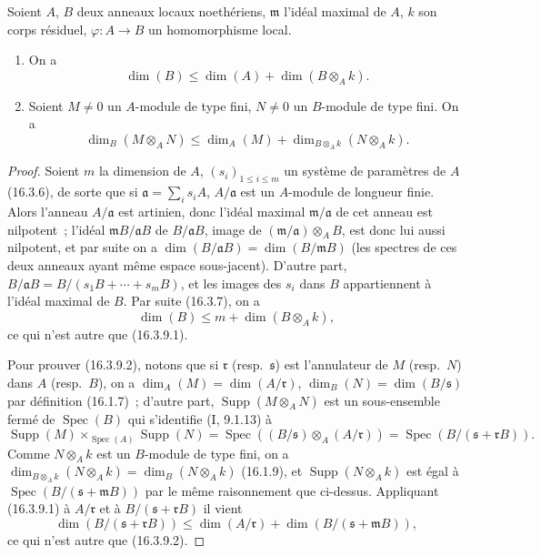 \begin{proposition}[16.3.9]
\label{0.16.3.9-fr}
Soient $A$, $B$ deux anneaux locaux noethériens, $\mathfrak{m}$ l'idéal maximal
de $A$, $k$ son corps résiduel, $\varphi:A\to B$ un homomorphisme local.
\begin{enumerate}
  \item[\rm{(i)}] On a
  \begin{equation}
  \label{0.16.3.9.1-fr}
  \tag{16.3.9.1}
    \dim(B)\leq\dim(A)+\dim(B\otimes_A k).
  \end{equation}
  \item[\rm{(ii)}] Soient $M\neq0$ un $A$-module de type fini, $N\neq0$ un
  $B$-module de type fini. On a
  \begin{equation}
  \label{0.16.3.9.2-fr}
  \tag{16.3.9.2}
    \dim_B(M\otimes_A N)
    \leq\dim_A(M)+\dim_{B\otimes_A k}(N\otimes_A k).
  \end{equation}
\end{enumerate}
\end{proposition}

\begin{proof}
Soient $m$ la dimension de $A$, $(s_i)_{1\leq i\leq m}$ un système de
paramètres de $A$ (16.3.6), de sorte que si
$\mathfrak{a}=\sum_i s_iA$, $A/\mathfrak{a}$ est un $A$-module de longueur
finie. Alors l'anneau $A/\mathfrak{a}$ est artinien, donc l'idéal maximal
$\mathfrak{m}/\mathfrak{a}$ de cet anneau est nilpotent~; l'idéal
$\mathfrak{m}B/\mathfrak{a}B$ de $B/\mathfrak{a}B$, image de
$(\mathfrak{m}/\mathfrak{a})\otimes_A B$, est donc lui aussi nilpotent, et par
suite on a
$\dim(B/\mathfrak{a}B)=\dim(B/\mathfrak{m}B)$ (les spectres de ces deux
anneaux ayant même espace sous-jacent). D'autre part,
$B/\mathfrak{a}B=B/(s_1B+\cdots+s_mB)$, et les images des $s_i$ dans $B$
appartiennent à l'idéal maximal de $B$. Par suite (16.3.7), on a
\[
  \dim(B)\leq m+\dim(B\otimes_A k),
\]
ce qui n'est autre que (16.3.9.1).

Pour prouver (16.3.9.2), notons que si $\mathfrak{r}$ (resp.~$\mathfrak{s}$)
est l'annulateur de $M$ (resp.~$N$)
dans $A$ (resp.~$B$), on a
$\dim_A(M)=\dim(A/\mathfrak{r})$, $\dim_B(N)=\dim(B/\mathfrak{s})$ par
définition (16.1.7)~; d'autre part, $\operatorname{Supp}(M\otimes_A N)$ est un
sous-ensemble fermé de $\operatorname{Spec}(B)$ qui s'identifie (I, 9.1.13) à
\[
  \operatorname{Supp}(M)\times_{\operatorname{Spec}(A)}\operatorname{Supp}(N)
  =\operatorname{Spec}((B/\mathfrak{s})\otimes_A(A/\mathfrak{r}))
  =\operatorname{Spec}(B/(\mathfrak{s}+\mathfrak{r}B)).
\]
Comme $N\otimes_A k$ est un $B$-module de type fini, on a
$\dim_{B\otimes_A k}(N\otimes_A k)=\dim_B(N\otimes_A k)$ (16.1.9), et
$\operatorname{Supp}(N\otimes_A k)$ est égal à
$\operatorname{Spec}(B/(\mathfrak{s}+\mathfrak{m}B))$ par le même raisonnement
que ci-dessus. Appliquant (16.3.9.1) à $A/\mathfrak{r}$ et à
$B/(\mathfrak{s}+\mathfrak{r}B)$ il vient
\[
  \dim(B/(\mathfrak{s}+\mathfrak{r}B))
  \leq\dim(A/\mathfrak{r})+
  \dim(B/(\mathfrak{s}+\mathfrak{m}B)),
\]
ce qui n'est autre que (16.3.9.2).
\end{proof}

